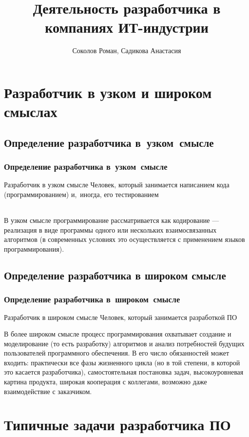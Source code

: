 \documentclass[lecturenotes]{../industrial-development}
\title{Деятельность разработчика в компаниях ИТ-индустрии}
\author{Соколов Роман, Садикова Анастасия}
\date{}
\begin{document}
\begin{frame}
  \titlepage
\end{frame}


\section{Разработчик в узком и широком смыслах}
\subsection{Определение разработчика в~узком~смысле}
\begin{frame} \frametitle{Определение разработчика в~узком~смысле}
	\begin{block}{Разработчик в узком смысле}
		 Человек, который занимается написанием кода (программированием) и,~иногда, его тестированием
	\end{block}
\end{frame}
\lecturenotes
\\В узком смысле программирование рассматривается как кодирование --- реализация в виде программы одного или нескольких взаимосвязанных алгоритмов (в современных условиях это осуществляется с применением языков программирования). 


\subsection{Определение разработчика в широком смысле}
\begin{frame} \frametitle{Определение разработчика в~широком~смысле}
	\begin{block}{Разработчик в широком смысле}
		 Человек, который занимается разработкой ПО
	\end{block}
\end{frame}
\lecturenotes
В более широком смысле процесс программирования охватывает создание и моделирование (то есть разработку) алгоритмов и анализ потребностей будущих пользователей программного обеспечения. В его число обязанностей может входить: практически все фазы жизненного цикла (но в той степени, в которой это касается разработчика), самостоятельная постановка задач, высокоуровневая картина продукта, широкая кооперация с коллегами, возможно даже взаимодействие с заказчиком.


\section{Типичные задачи разработчика ПО}
\end{document}
